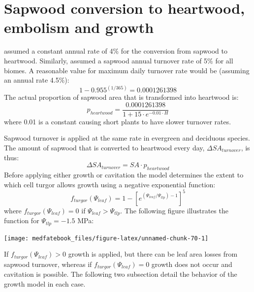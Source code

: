 \documentclass[]{book}
\begin{document}
\hypertarget{sapwood-conversion-to-heartwood-embolism-and-growth-1}{%
\section{Sapwood conversion to heartwood, embolism and growth}\label{sapwood-conversion-to-heartwood-embolism-and-growth-1}}

\citet{Prentice1993} assumed a constant annual rate of 4\% for the conversion from sapwood to heartwood. Similarly, \citet{Sitch2003} assumed a sapwood annual turnover rate of 5\% for all biomes. A reasonable value for maximum daily turnover rate would be (assuming an annual rate 4.5\%):
\begin{equation}
1-0.955^{(1/365)} = 0.0001261398
\end{equation}
The actual proportion of sapwood area that is transformed into heartwood is:
\begin{equation}
p_{heartwood} = \frac{0.0001261398}{1+15\cdot e^{-0.01\cdot H}}
\end{equation}
where 0.01 is a constant causing short plants to have slower turnover rates.

Sapwood turnover is applied at the same rate in evergreen and deciduous species. The amount of sapwood that is converted to heartwood every day, \(\Delta SA_{turnover}\), is thus:
\begin{equation}
\Delta SA_{turnover} = SA \cdot p_{heartwood}
\end{equation}
Before applying either growth or cavitation the model determines the extent to which cell turgor allows growth using a negative exponential function:
\begin{equation}
f_{turgor}(\Psi_{leaf}) = 1 - \left[e^{(\Psi_{leaf}/\Psi_{tlp})-1}\right]^5
\end{equation}
where \(f_{turgor}(\Psi_{leaf})=0\) if \(\Psi_{leaf} > \Psi_{tlp}\). The following figure illustrates the function for \(\Psi_{tlp}=-1.5\) MPa:

\begin{center}\texttt{[image: medfatebook\_files/figure-latex/unnamed-chunk-70-1]} \end{center}

If \(f_{turgor}(\Psi_{leaf})>0\) growth is applied, but there can be leaf area losses from sapwood turnover, whereas if \(f_{turgor}(\Psi_{leaf}) = 0\) growth does not occur and cavitation is possible. The following two subsection detail the behavior of the growth model in each case.
\end{document}
